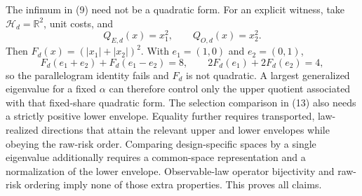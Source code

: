 The infimum in (9) need not be a quadratic form.  For an explicit witness, take \(\mathcal H_d=\mathbb R^2\), unit costs, and
\[
 Q_{E,d}(x)=x_1^2,
 \qquad
 Q_{O,d}(x)=x_2^2.
\]
Then \(F_d(x)=(|x_1|+|x_2|)^2\).  With \(e_1=(1,0)\) and \(e_2=(0,1)\),
\[
 F_d(e_1+e_2)+F_d(e_1-e_2)=8,
 \qquad
 2F_d(e_1)+2F_d(e_2)=4,
\]
so the parallelogram identity fails and \(F_d\) is not quadratic.  A largest generalized eigenvalue for a fixed \(\alpha\) can therefore control only the upper quotient associated with that fixed-share quadratic form.  The selection comparison in (13) also needs a strictly positive lower envelope.  Equality further requires transported, law-realized directions that attain the relevant upper and lower envelopes while obeying the raw-risk order.  Comparing design-specific spaces by a single eigenvalue additionally requires a common-space representation and a normalization of the lower envelope.  Observable-law operator bijectivity and raw-risk ordering imply none of those extra properties.  This proves all claims.